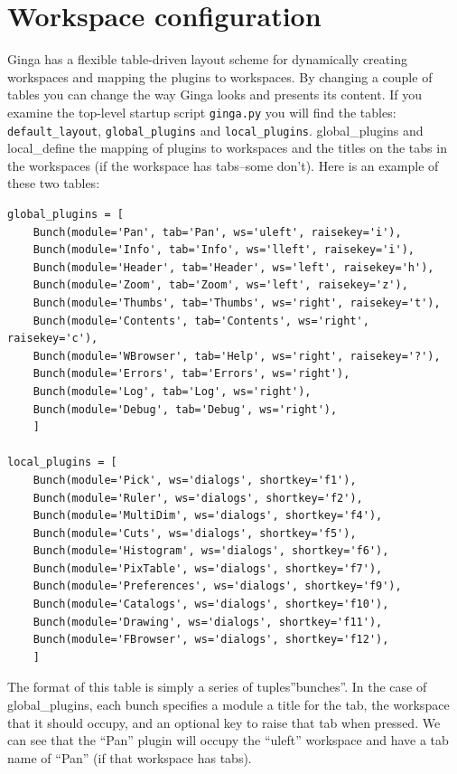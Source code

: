 \documentclass[11pt]{report}
\begin{document}
\section{Workspace configuration}
\label{sec:workspaceconfig}
Ginga has a flexible table-driven layout scheme for dynamically creating
workspaces and mapping the plugins to workspaces.  By changing a couple
of tables you can change the way Ginga looks and presents its content. 
If you examine the top-level startup script {\tt ginga.py} you will find
the tables: {\tt default\_layout}, {\tt global\_plugins} and
{\tt local\_plugins}.
global\_plugins and local_\plugins define the mapping of plugins to
workspaces and the titles on the tabs in the workspaces (if the
workspace has tabs--some don't).  
Here is an example of these two tables:
\begin{lstlisting}
global_plugins = [
    Bunch(module='Pan', tab='Pan', ws='uleft', raisekey='i'),
    Bunch(module='Info', tab='Info', ws='lleft', raisekey='i'),
    Bunch(module='Header', tab='Header', ws='left', raisekey='h'),
    Bunch(module='Zoom', tab='Zoom', ws='left', raisekey='z'),
    Bunch(module='Thumbs', tab='Thumbs', ws='right', raisekey='t'),
    Bunch(module='Contents', tab='Contents', ws='right', raisekey='c'),
    Bunch(module='WBrowser', tab='Help', ws='right', raisekey='?'),
    Bunch(module='Errors', tab='Errors', ws='right'),
    Bunch(module='Log', tab='Log', ws='right'),
    Bunch(module='Debug', tab='Debug', ws='right'),
    ]

local_plugins = [
    Bunch(module='Pick', ws='dialogs', shortkey='f1'),
    Bunch(module='Ruler', ws='dialogs', shortkey='f2'),
    Bunch(module='MultiDim', ws='dialogs', shortkey='f4'), 
    Bunch(module='Cuts', ws='dialogs', shortkey='f5'),
    Bunch(module='Histogram', ws='dialogs', shortkey='f6'),
    Bunch(module='PixTable', ws='dialogs', shortkey='f7'),
    Bunch(module='Preferences', ws='dialogs', shortkey='f9'),
    Bunch(module='Catalogs', ws='dialogs', shortkey='f10'),
    Bunch(module='Drawing', ws='dialogs', shortkey='f11'),
    Bunch(module='FBrowser', ws='dialogs', shortkey='f12'), 
    ]
\end{lstlisting}
The format of this table is simply a series of tuples''bunches''.
In the case of global\_plugins, each bunch specifies a module 
a title for the tab, the workspace that it should occupy, and an
optional key to raise that tab when pressed.
We can see that the ``Pan'' plugin will occupy the ``uleft'' workspace
and have a tab name of ``Pan'' (if that workspace has tabs).
\end{document}
